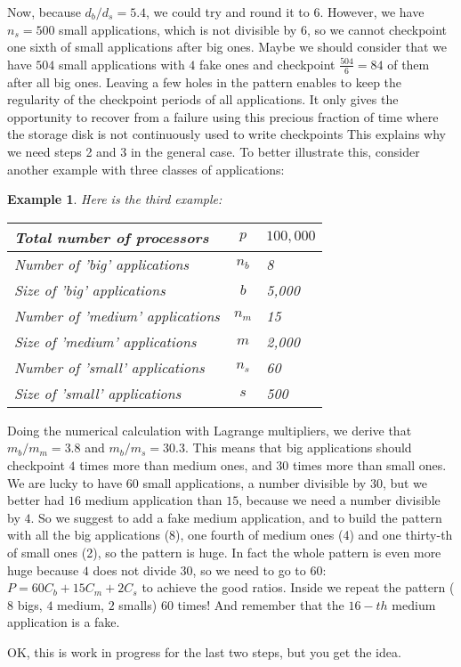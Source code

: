 \documentclass{article}
\newtheorem{example}{Example}
\begin{document}
Now, because $d_{b}/d_{s} =5.4$, we could try and round it to $6$. However, we have $n_{s}=500$
small applications, which is not divisible by $6$, so we cannot checkpoint one sixth of small applications after big ones.  Maybe we should consider that we have $504$ small applications with $4$ fake ones and checkpoint
$\frac{504}{6} = 84$  of them after all big ones. Leaving a few holes in the pattern enables to keep the
regularity of the checkpoint periods of all applications. It only gives the opportunity to recover from a failure
using this precious fraction of time where the storage disk is not continuously used to write checkpoints This explains why we need steps 2 and 3 in the general case. To better illustrate this, consider another example with three classes of applications:

\begin{example}
Here is the third example:
\begin{center}
\begin{tabular}{lcl}
  Total number of processors & $p$ & $100,000$\\\hline
  Number of 'big' applications & $n_{b}$ & 8 \\\hline
  Size of 'big' applications & $b$ & 5,000\\\hline
  Number of 'medium' applications & $n_{m}$ & 15\\\hline
  Size of 'medium' applications & $m$ & 2,000\\\hline
  Number of 'small' applications & $n_{s}$ & 60\\\hline
  Size of 'small' applications & $s$ & 500\\\hline
 \end{tabular}
\end{center}
\label{example3}
\end{example}

Doing the numerical calculation with Lagrange multipliers, we derive that 
$m_{b} / m_{m} = 3.8$ and  $m_{b} / m_{s} = 30.3$. This means that big applications
should checkpoint $4$ times more than medium ones, and $30$ times more than small ones.
We are lucky to have $60$ small applications, a number divisible by $30$,
but we better had $16$ medium application than $15$, because we need a number divisible by $4$.
So we suggest to add a fake medium application, 
and to build the pattern with all the big applications (8), one fourth of medium ones (4)
and one thirty-th of small ones (2), so the pattern is huge. In fact the whole pattern is even more huge because
$4$ does not divide $30$, so we need to go to $60$:
$ P = 60 C_{b} + 15 C_{m } + 2 C_{s}$
to achieve the good ratios. Inside we repeat the pattern ($8$ bigs, $4$ medium, $2$ smalls) 
$60$ times! And remember that the $16-th$ medium application is a fake.

OK, this is work in progress for the last two steps, but you get the idea.
\end{document}
